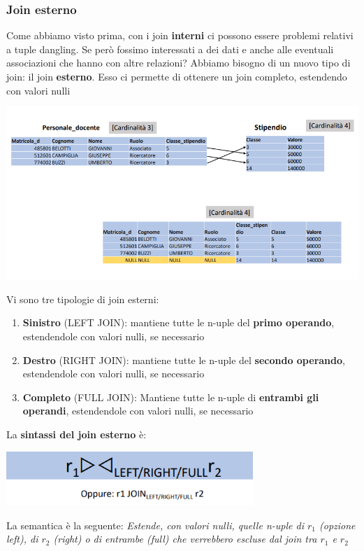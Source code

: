 \documentclass[12pt]{article}
\begin{document}
\subsubsection{Join esterno}
Come abbiamo visto prima, con i join \textbf{interni} ci possono essere problemi relativi a tuple dangling.
Se però fossimo interessati a dei dati e anche alle eventuali associazioni che hanno con altre relazioni?
Abbiamo bisogno di un nuovo tipo di join: il join \textbf{esterno}.
Esso ci permette di ottenere un join completo, estendendo con valori nulli
\begin{center}
    \includegraphics[width =1.10\textwidth]{Images/151.PNG}
\end{center}
Vi sono tre tipologie di join esterni:
\begin{enumerate}
    \item \textbf{Sinistro} (LEFT JOIN): mantiene tutte le n-uple del \textbf{primo operando}, estendendole con valori nulli, se necessario
    \item \textbf{Destro} (RIGHT JOIN): mantiene tutte le n-uple del \textbf{secondo operando}, estendendole con valori nulli, se necessario
    \item \textbf{Completo} (FULL JOIN): Mantiene tutte le n-uple di \textbf{entrambi gli operandi}, estendendole con valori nulli, se necessario
\end{enumerate}
La \textbf{sintassi del join esterno} è:
\begin{center}
    \includegraphics[width =0.70\textwidth]{Images/152.PNG}
\end{center}
La semantica è la seguente: \textit{Estende, con valori nulli, quelle n-uple di $r_1$ (opzione left), di $r_2$ (right) o di entrambe (full) che verrebbero escluse dal join tra $r_1$ e $r_2$}
\end{document}
